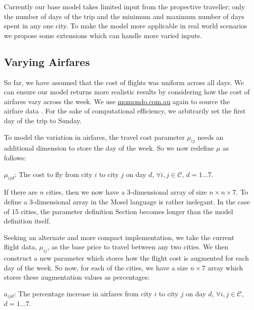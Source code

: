 \documentclass[12pt]{article}
\begin{document}

Currently our base model takes limited input from the propective traveller; only the number of days of the trip and the minimum and maximum number of days spent in any one city. To make the model more applicable in real world scenarios we propose some extensions which can handle more varied inputs.

\subsection{Varying Airfares}
So far, we have assumed that the cost of flights was uniform across all days. We can ensure our model returns more realistic results by considering how the cost of airfares vary across the week. We use \url{momondo.com.au} again to source the airfare data \cite{momondo}. For the sake of computational efficiency, we arbitrarily set the first day of the trip to Sunday.

To model the variation in airfares, the travel cost parameter $\mu_{ij}$ needs an additional dimension to store the day of the week. So we now redefine $\mu$ as follows:

$\mu_{ijd}$: The cost to fly from city $i$ to city $j$ on day $d$, $\forall i,j \in \mathcal{C}$, $d=1...7$.

If there are $n$ cities, then we now have a 3-dimensional array of size $n\times n\times 7$. To define a 3-dimensional array in the Mosel language is rather inelegant. In the case of 15 cities, the parameter definition Section becomes longer than the model definition itself.

Seeking an alternate and more compact implementation, we take the current flight data, $\mu_{ij}$, as the base price to travel between any two cities. We then construct a new parameter which stores how the flight cost is augmented for each day of the week. So now, for each of the cities, we have a size $n \times 7$ array which stores these augmentation values as percentages:

$a_{ijd}$: The percentage increase in airfares from city $i$ to city $j$ on day $d$, $\forall i,j \in \mathcal{C}$, $d=1...7$.\\
\end{document}

